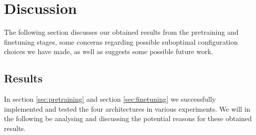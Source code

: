 \documentclass[./main.tex]{subfiles}
\begin{document}
\section{Discussion}
\label{sec:discussion}
The following section discusses our obtained results from the pretraining and finetuning stages, some concerns regarding possible suboptimal configuration choices we have made, as well as suggests some possible future work. 

\subsection{Results}
\label{sec:results}
In section \ref{sec:pretraining} and section \ref{sec:finetuning} we successfully implemented and tested the four architectures in various experiments. We will in the following be analysing and discussing the potential reasons for these obtained results.
\end{document}
